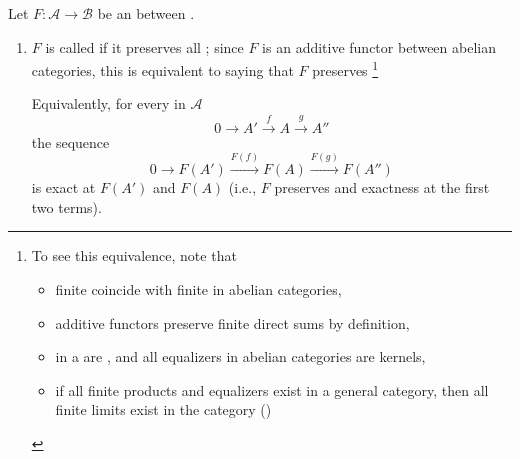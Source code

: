 \begin{definition} \label{definition:exact_functor_between_abelian_categories}
    Let $F: \mathcal{A} \to \mathcal{B}$ be an  between .
    \begin{enumerate}

        \item $F$ is called  if it preserves all ; since $F$ is an additive functor between abelian categories, this is equivalent to saying that $F$ preserves \footnote{
            To see this equivalence, note that 
            \begin{itemize}
                \item finite  coincide with finite  in abelian categories,
                \item additive functors preserve finite direct sums by definition,
                \item {} in a  are , and all equalizers in abelian categories are kernels,
                \item if all finite products and equalizers exist in a general category, then all finite limits exist in the category ()
            \end{itemize}
        }
        
        Equivalently, for every  in $\mathcal{A}$
        \[
        0 \to A' \xrightarrow{f} A \xrightarrow{g} A''
        \]
        the sequence
        \[
        0 \to F(A') \xrightarrow{F(f)} F(A) \xrightarrow{F(g)} F(A'')
        \]
        is exact at $F(A')$ and $F(A)$ (i.e., $F$ preserves  and exactness at the first two terms).


\end{enumerate}
\end{definition}
